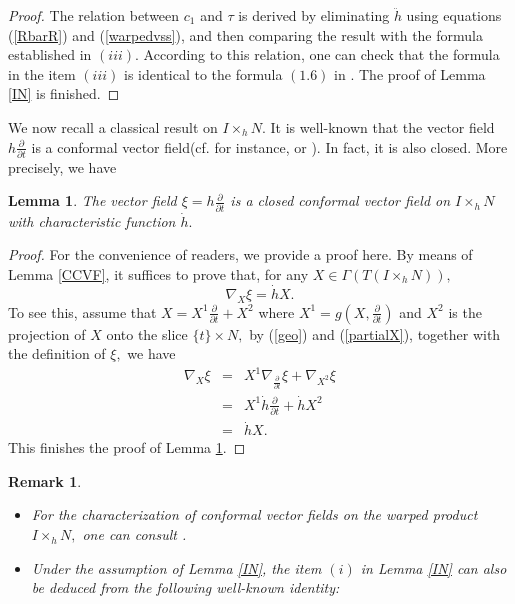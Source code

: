 \documentclass[10pt,leqno,oneside]{amsart}
\newtheorem{Lem}{Lemma}
\newtheorem{Rmk}{Remark}
\begin{document}
{\begin{proof}
           The relation between $c_1$ and $\tau$ is derived by eliminating $\ddot{h}$ using equations (\ref{RbarR}) and (\ref{warpedvss}), and then comparing the result with the formula established in $(iii).$ According to this relation, one can check that the formula in the item $(iii)$ is identical to the formula $(1.6)$ in \cite{Kobayashi1982}. The proof of Lemma \ref{IN} is finished.
    \end{proof}



           We now recall a classical result on $I\times_hN.$ It is well-known that the vector field $h\frac{\partial}{\partial t}$ is a conformal vector field(cf. for instance, \cite[Lemma 2.4]{Ejiri} or \cite[Lemma 2.2]{Brendle2013}). In fact, it is also closed. More precisely, we have
    \begin{Lem}\label{CCVFhpartial}
          The vector field $\xi=h\frac{\partial}{\partial t}$ is a closed conformal vector field on $I\times_hN$ with characteristic function $\dot{h}.$
    \end{Lem}
    \begin{proof}
          For the convenience of readers, we provide a proof here. By means of Lemma \ref{CCVF}, it suffices to prove that, for any $X\in\Gamma(T(I\times_hN)),$
          $$\nabla_X\xi=\dot{h}X.$$
          To see this, assume that $X=X^1\frac{\partial}{\partial t}+X^2$ where $X^1=g(X,\frac{\partial}{\partial t})$ and $X^2$ is the projection of $X$ onto the slice $\{t\}\times N ,$ by (\ref{geo}) and (\ref{partialX}), together with the definition of $\xi,$ we have
          \begin{eqnarray*}
          \nabla_X\xi&=& X^1\nabla_{\frac{\partial}{\partial t}}\xi+\nabla_{X^2}\xi \\
             &=&X^1\dot{h}\frac{\partial}{\partial t}+\dot{h}X^2 \\
             &=&\dot{h}X.
          \end{eqnarray*}
          This finishes the proof of Lemma \ref{CCVFhpartial}.
    \end{proof}
    \begin{Rmk}\label{fformulaR}
         \begin{itemize}[leftmargin=0.5cm, itemindent=0.4cm]
           \item[{\rm(1)}.] For the characterization of conformal vector fields on the warped product $I\times_hN ,$ one can consult {\rm\cite[Appendix A]{JaureguiWylie2015}}.
           \item[{\rm(2)}.] Under the assumption of Lemma {\rm\ref{IN}}, the item $(i)$ in Lemma {\rm\ref{IN}} can also be deduced from the following well-known identity:

\end{itemize}
\end{Rmk}}
\end{document}
